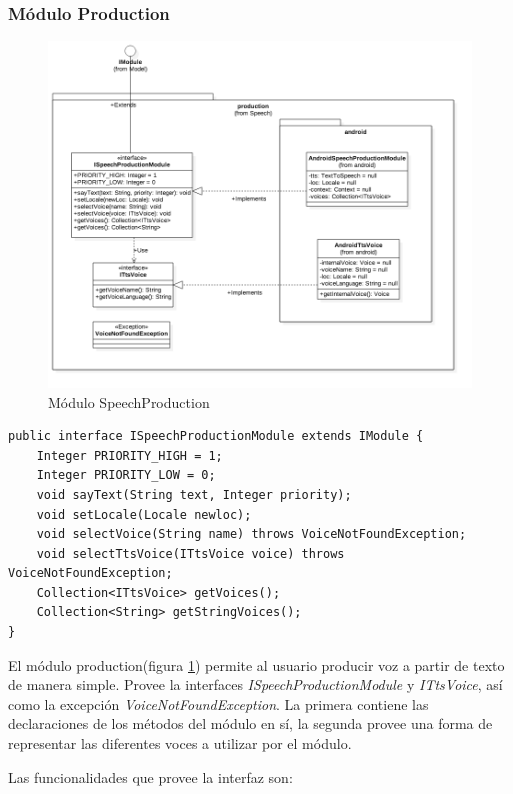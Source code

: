 \subsubsection{Módulo Production}
\begin{figure}
	\centering
	\includegraphics[width=1\linewidth]{imagenes/diagramas/SpeechProductionModule.png}
	\caption{Módulo SpeechProduction}
	\label{fig:speech-production-module}
\end{figure}
\begin{lstlisting}
public interface ISpeechProductionModule extends IModule {
    Integer PRIORITY_HIGH = 1;
    Integer PRIORITY_LOW = 0;
    void sayText(String text, Integer priority);
    void setLocale(Locale newloc);
    void selectVoice(String name) throws VoiceNotFoundException;
    void selectTtsVoice(ITtsVoice voice) throws VoiceNotFoundException;
    Collection<ITtsVoice> getVoices();
    Collection<String> getStringVoices();
}

\end{lstlisting}

El módulo production(figura \ref{fig:speech-production-module}) permite al usuario producir voz a partir de texto de manera simple.
Provee la interfaces \textit{ISpeechProductionModule} y \textit{ITtsVoice}, así como la excepción \textit{VoiceNotFoundException}.
La primera contiene las declaraciones de los métodos del módulo en sí, la segunda provee una forma de representar las diferentes voces a utilizar por el módulo.

Las funcionalidades que provee la interfaz son:

